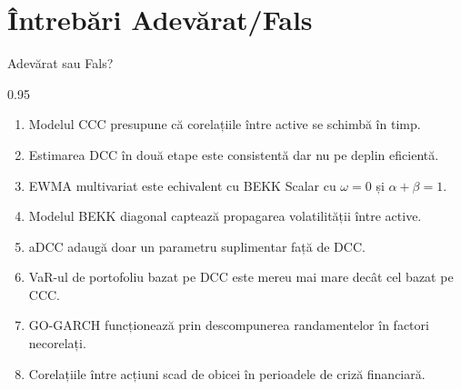 \documentclass[9pt, aspectratio=169, t]{beamer}
\begin{document}
\section{Întrebări Adevărat/Fals}

\begin{frame}{Adevărat sau Fals?}
    \begin{cminipage}{0.95\textwidth}
    \begin{enumerate}\setlength{\itemsep}{0pt}
        \item Modelul CCC presupune că corelațiile între active se schimbă în timp.

        \vspace{0.3cm}

        \item Estimarea DCC în două etape este consistentă dar nu pe deplin eficientă.

        \vspace{0.3cm}

        \item EWMA multivariat este echivalent cu BEKK Scalar cu $\omega = 0$ și $\alpha + \beta = 1$.

        \vspace{0.3cm}

        \item Modelul BEKK diagonal captează propagarea volatilității între active.

        \vspace{0.3cm}

        \item aDCC adaugă doar un parametru suplimentar față de DCC.

        \vspace{0.3cm}

        \item VaR-ul de portofoliu bazat pe DCC este mereu mai mare decât cel bazat pe CCC.

        \vspace{0.3cm}

        \item GO-GARCH funcționează prin descompunerea randamentelor în factori necorelați.

        \vspace{0.3cm}

        \item Corelațiile între acțiuni scad de obicei în perioadele de criză financiară.
    \end{enumerate}
    \end{cminipage}
\end{frame}
\end{document}
